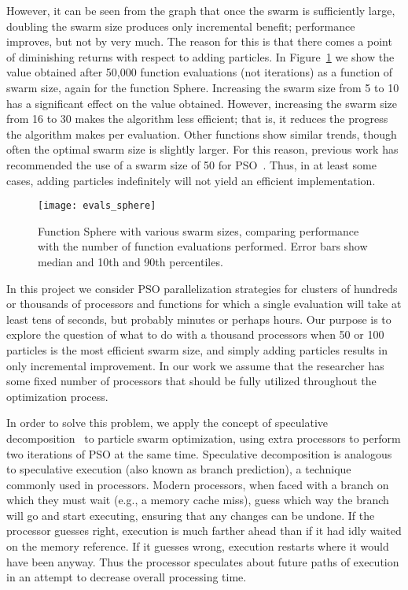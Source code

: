 \documentclass[ms]{byuprop}
\newcommand{\figref}[1]{Figure~\ref{fig:#1}}
\begin{document}
However, it can be seen from the graph that once the swarm is sufficiently
large, doubling the swarm size produces only incremental benefit; performance
improves, but not by very much.  The reason for this is that there comes a
point of diminishing returns with respect to adding particles.  In
\figref{evals-sphere} we show the value obtained after 50,000 function
evaluations (not iterations) as a function of swarm size, again for the
function Sphere.  Increasing the swarm size from 5 to 10 has a significant
effect on the value obtained.  However, increasing the swarm size from 16 to 30
makes the algorithm less efficient; that is, it reduces the progress the
algorithm makes per evaluation.  Other functions show similar trends, though
often the optimal swarm size is slightly larger.  For this reason, previous
work has recommended the use of a swarm size of 50 for
PSO~\citep{bratton-2007-defining-a-standard-for-pso}.  Thus, in at least some
cases, adding particles indefinitely will not yield an efficient
implementation. 

\begin{figure}
  \centering
  \texttt{[image: evals\_sphere]}
  \caption{Function Sphere with various swarm sizes, comparing performance with
  the number of function evaluations performed.  Error bars show median and
  10th and 90th percentiles.}
  \label{fig:evals-sphere}
\end{figure}

In this project we consider PSO parallelization strategies for clusters of
hundreds or thousands of processors and functions for which a single evaluation
will take at least tens of seconds, but probably minutes or perhaps hours.  Our
purpose is to explore the question of what to do with a thousand processors
when 50 or 100 particles is the most efficient swarm size, and simply adding
particles results in only incremental improvement.  In our work we assume that
the researcher has some fixed number of processors that should be fully
utilized throughout the optimization process.

In order to solve this problem, we apply the concept of speculative
decomposition~\citep{grama-2003-intro-to-parallel-computing} to particle swarm
optimization, using extra processors to perform two iterations of PSO at the
same time.  Speculative decomposition is analogous to speculative execution
(also known as branch prediction), a technique commonly used in processors.
Modern processors, when faced with a branch on which they must wait (e.g., a
memory cache miss), guess which way the branch will go and start executing,
ensuring that any changes can be undone.  If the processor guesses right,
execution is much farther ahead than if it had idly waited on the memory
reference.  If it guesses wrong, execution restarts where it would have been
anyway.  Thus the processor speculates about future paths of execution in an
attempt to decrease overall processing time.
\end{document}
